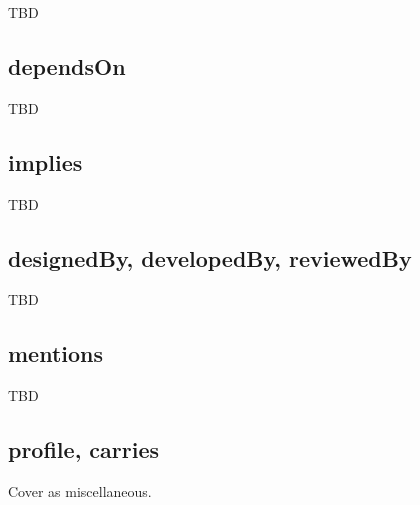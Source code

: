 TBD

\begin{comment}
Contributions based on other contributions
Contributions varying other contributions
\end{comment}


\subsection{dependsOn}

TBD


\subsection{implies}

TBD


\subsection{designedBy, developedBy, reviewedBy}

TBD


\subsection{mentions}



TBD


\subsection{profile, carries}

Cover as miscellaneous.


